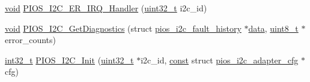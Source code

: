 \begin{DoxyCompactItemize}
\item 
\hyperlink{group___n_a_m_e_ga18028b8badbf1ea7e704ccac3c488e82}{void} \hyperlink{group___p_i_o_s___i2_c_ga3039907b5945c06d4c27e756647fa75c}{P\-I\-O\-S\-\_\-\-I2\-C\-\_\-\-E\-R\-\_\-\-I\-R\-Q\-\_\-\-Handler} (\hyperlink{stdint_8h_a435d1572bf3f880d55459d9805097f62}{uint32\-\_\-t} i2c\-\_\-id)
\item 
\hyperlink{group___n_a_m_e_ga18028b8badbf1ea7e704ccac3c488e82}{void} \hyperlink{group___p_i_o_s___i2_c_ga6a77173f087765671ea1e440471637a5}{P\-I\-O\-S\-\_\-\-I2\-C\-\_\-\-Get\-Diagnostics} (struct \hyperlink{structpios__i2c__fault__history}{pios\-\_\-i2c\-\_\-fault\-\_\-history} $\ast$\hyperlink{pios__opahrs__proto_8h_a20e3f4bfaeccf09a75ef27e095a10112}{data}, \hyperlink{stdint_8h_aba7bc1797add20fe3efdf37ced1182c5}{uint8\-\_\-t} $\ast$error\-\_\-counts)
\item 
\hyperlink{group___n_a_m_e_gafd12020da5a235dfcf0c3c748fb5baed}{int32\-\_\-t} \hyperlink{group___p_i_o_s___i2_c_ga10b19295cb30ec2e44c0a11f45cf28fe}{P\-I\-O\-S\-\_\-\-I2\-C\-\_\-\-Init} (\hyperlink{stdint_8h_a435d1572bf3f880d55459d9805097f62}{uint32\-\_\-t} $\ast$i2c\-\_\-id, \hyperlink{group___n_a_m_e_ga7ae6d0e43244213b34de2c2b9aa30da6}{const} struct \hyperlink{structpios__i2c__adapter__cfg}{pios\-\_\-i2c\-\_\-adapter\-\_\-cfg} $\ast$cfg)
\end{DoxyCompactItemize}
